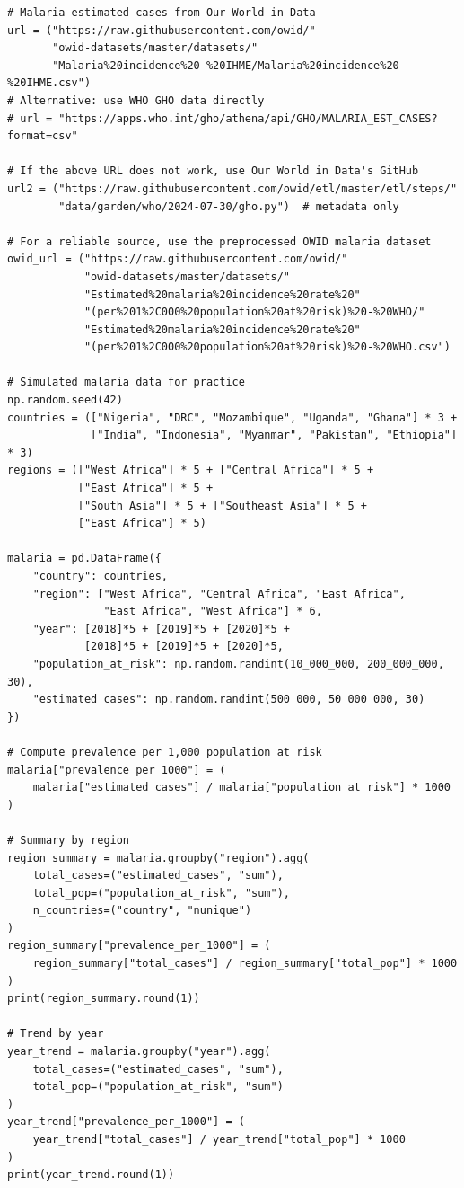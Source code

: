 \begin{verbatim}
# Malaria estimated cases from Our World in Data
url = ("https://raw.githubusercontent.com/owid/"
       "owid-datasets/master/datasets/"
       "Malaria%20incidence%20-%20IHME/Malaria%20incidence%20-%20IHME.csv")
# Alternative: use WHO GHO data directly
# url = "https://apps.who.int/gho/athena/api/GHO/MALARIA_EST_CASES?format=csv"

# If the above URL does not work, use Our World in Data's GitHub
url2 = ("https://raw.githubusercontent.com/owid/etl/master/etl/steps/"
        "data/garden/who/2024-07-30/gho.py")  # metadata only

# For a reliable source, use the preprocessed OWID malaria dataset
owid_url = ("https://raw.githubusercontent.com/owid/"
            "owid-datasets/master/datasets/"
            "Estimated%20malaria%20incidence%20rate%20"
            "(per%201%2C000%20population%20at%20risk)%20-%20WHO/"
            "Estimated%20malaria%20incidence%20rate%20"
            "(per%201%2C000%20population%20at%20risk)%20-%20WHO.csv")

# Simulated malaria data for practice
np.random.seed(42)
countries = (["Nigeria", "DRC", "Mozambique", "Uganda", "Ghana"] * 3 +
             ["India", "Indonesia", "Myanmar", "Pakistan", "Ethiopia"] * 3)
regions = (["West Africa"] * 5 + ["Central Africa"] * 5 +
           ["East Africa"] * 5 +
           ["South Asia"] * 5 + ["Southeast Asia"] * 5 +
           ["East Africa"] * 5)

malaria = pd.DataFrame({
    "country": countries,
    "region": ["West Africa", "Central Africa", "East Africa",
               "East Africa", "West Africa"] * 6,
    "year": [2018]*5 + [2019]*5 + [2020]*5 +
            [2018]*5 + [2019]*5 + [2020]*5,
    "population_at_risk": np.random.randint(10_000_000, 200_000_000, 30),
    "estimated_cases": np.random.randint(500_000, 50_000_000, 30)
})

# Compute prevalence per 1,000 population at risk
malaria["prevalence_per_1000"] = (
    malaria["estimated_cases"] / malaria["population_at_risk"] * 1000
)

# Summary by region
region_summary = malaria.groupby("region").agg(
    total_cases=("estimated_cases", "sum"),
    total_pop=("population_at_risk", "sum"),
    n_countries=("country", "nunique")
)
region_summary["prevalence_per_1000"] = (
    region_summary["total_cases"] / region_summary["total_pop"] * 1000
)
print(region_summary.round(1))

# Trend by year
year_trend = malaria.groupby("year").agg(
    total_cases=("estimated_cases", "sum"),
    total_pop=("population_at_risk", "sum")
)
year_trend["prevalence_per_1000"] = (
    year_trend["total_cases"] / year_trend["total_pop"] * 1000
)
print(year_trend.round(1))
\end{verbatim}

